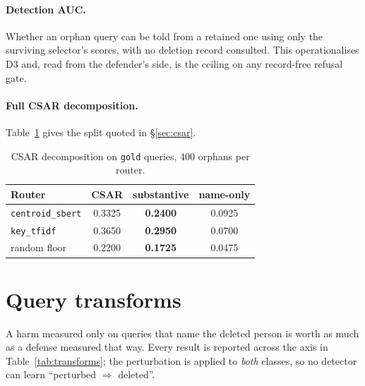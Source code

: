 \documentclass{article}
\newcommand{\csar}{CSAR}
\begin{document}
\paragraph{Detection AUC.} Whether an orphan query can be told from a retained one using only the
surviving selector's scores, with no deletion record consulted. This operationalises D3 and, read
from the defender's side, is the ceiling on any record-free refusal gate.

\paragraph{Full \csar{} decomposition.} Table~\ref{tab:decompose} gives the split quoted in
\S\ref{sec:csar}.

\begin{table}[ht]
  \caption{\csar{} decomposition on \texttt{gold} queries, 400 orphans per router.}
  \label{tab:decompose}
  \centering
  \small
  \begin{tabular}{@{}lccc@{}}
    \toprule
    Router & \csar{} & \textbf{substantive} & name-only \\
    \midrule
    \texttt{centroid\_sbert} & 0.3325 & \textbf{0.2400} & 0.0925 \\
    \texttt{key\_tfidf}      & 0.3650 & \textbf{0.2950} & 0.0700 \\
    random floor             & 0.2200 & \textbf{0.1725} & 0.0475 \\
    \bottomrule
  \end{tabular}
\end{table}

\section{Query transforms}
\label{app:transforms}

A harm measured only on queries that name the deleted person is worth as much as a defense measured
that way. Every result is reported across the axis in Table~\ref{tab:transforms}; the perturbation
is applied to \emph{both} classes, so no detector can learn ``perturbed $\Rightarrow$ deleted''.
\end{document}
